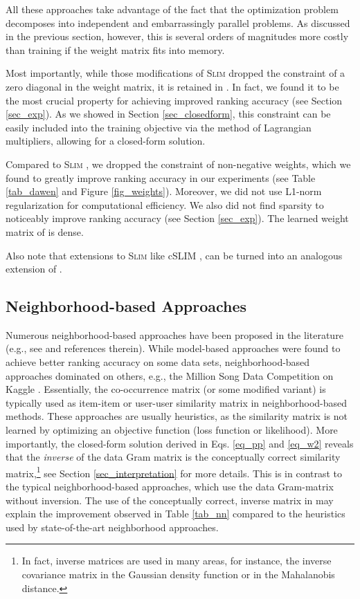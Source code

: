 \documentclass[sigconf]{acmart}
\newcommand{\slim}{{\scshape Slim}}
\newcommand{\sae}{}
\begin{document}
All these approaches take advantage of the fact that the optimization problem decomposes into  independent and embarrassingly parallel  problems. As discussed in the previous section, however,  this is several orders of magnitudes  more costly than training \sae{}  if the weight matrix fits into memory.

Most importantly, while  those modifications of \slim{} dropped the constraint of a zero diagonal in the weight matrix, it is retained  in \sae. In fact, we found it to be the most crucial property for achieving improved ranking accuracy (see Section \ref{sec_exp}). As we showed in Section \ref{sec_closedform}, this constraint can be easily included into the training objective via the method of Lagrangian multipliers, allowing for a closed-form solution.


Compared to  \slim{}  \cite{ning11}, we dropped the constraint of non-negative weights, which we found to greatly improve ranking accuracy in our experiments (see Table \ref{tab_dawen} and Figure \ref{fig_weights}). Moreover, we  did not use L1-norm regularization for computational efficiency. We also did not find sparsity to noticeably improve ranking accuracy (see Section \ref{sec_exp}).  The learned weight matrix  of \sae{} is dense.

Also note that extensions to \slim{} like cSLIM \cite{ning12}, can be turned into an analogous extension of \sae.

\subsection {Neighborhood-based Approaches}
\label{sec_nn}
Numerous neighborhood-based approaches have been proposed in the literature (e.g., see \cite{koen14, volkovs15} and references therein). While model-based approaches were found to achieve better ranking accuracy on some data sets, neighborhood-based approaches dominated on others, e.g.,  the Million Song Data Competition on Kaggle \cite{mcfee12,aiolli13}. Essentially, the co-occurrence matrix (or some modified variant) is typically used as item-item or user-user similarity matrix in neighborhood-based methods. These approaches are usually heuristics, as the similarity matrix is  not learned by optimizing an objective function (loss function or likelihood). More importantly, the closed-form solution derived in Eqs. \ref{eq_pp} and \ref{eq_w2} reveals that the \emph{inverse} of the data Gram  matrix is the conceptually  correct similarity matrix,\footnote{In fact,  inverse matrices are used in many areas, for instance, the inverse covariance matrix in the Gaussian  density function or in the Mahalanobis distance.} see Section \ref{sec_interpretation} for more details.  This is in contrast to the typical neighborhood-based approaches, which use the data Gram-matrix without inversion.
The use of the conceptually correct, inverse matrix in \sae{}  may explain the improvement observed in Table \ref{tab_nn} compared to the heuristics used by state-of-the-art  neighborhood approaches. 
\end{document}
